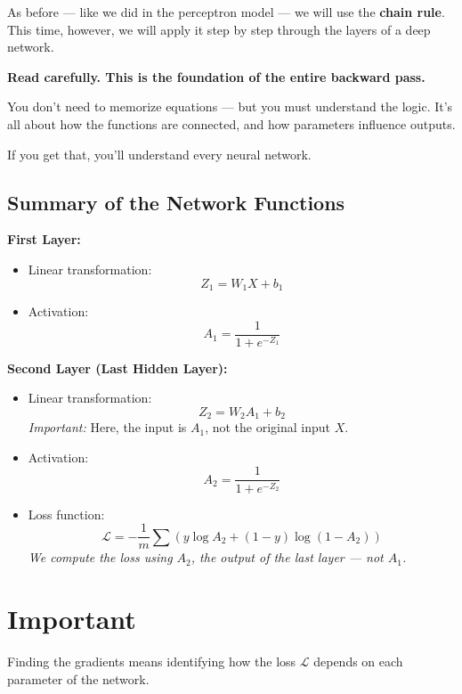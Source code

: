 \documentclass[11pt]{article}
\begin{document}
As before — like we did in the perceptron model — we will use the \textbf{chain rule}.  
This time, however, we will apply it step by step through the layers of a deep network.

\begin{warnbox}[title=Before We Start]
\textbf{Read carefully. This is the foundation of the entire backward pass.}

You don’t need to memorize equations — but you must understand the logic.  
It’s all about how the functions are connected, and how parameters influence outputs.

If you get that, you’ll understand every neural network.
\end{warnbox}

\subsection{Summary of the Network Functions}

\textbf{First Layer:}
\begin{itemize}
    \item Linear transformation:
    \[
    Z_1 = W_1 X + b_1
    \]
    \item Activation:
    \[
    A_1 = \frac{1}{1 + e^{-Z_1}}
    \]
\end{itemize}

\textbf{Second Layer (Last Hidden Layer):}
\begin{itemize}
    \item Linear transformation:
    \[
    Z_2 = W_2 A_1 + b_2
    \]
    \textit{Important:} Here, the input is $A_1$, not the original input $X$.

    \item Activation:
    \[
    A_2 = \frac{1}{1 + e^{-Z_2}}
    \]

    \item Loss function:
    \[
    \mathcal{L} = -\frac{1}{m} \sum \left( y \log A_2 + (1 - y) \log(1 - A_2) \right)
    \]
    \textit{We compute the loss using $A_2$, the output of the last layer — not $A_1$.}
\end{itemize}

\section{Important}

Finding the gradients means identifying how the loss $\mathcal{L}$ depends on each parameter of the network.
\end{document}
